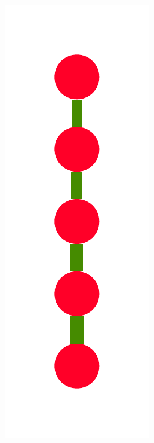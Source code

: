 \documentclass[a4paper,10pt]{article}
\begin{document}
\begin{figure}
{    \includegraphics[scale=.14]{../figures/vector/6-3-recursion-data-4.pdf}
}
\end{figure}
\end{document}
